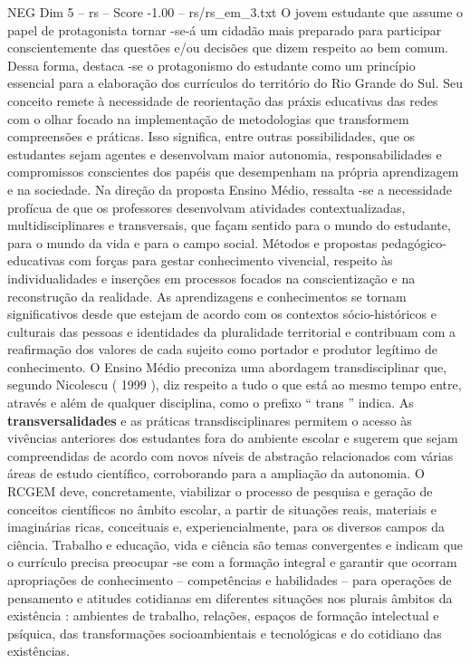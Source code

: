 \begin{textsample}{NEG Dim 5 – rs – Score -1.00 – rs/rs\_em\_3.txt}
O jovem estudante que assume o papel de protagonista tornar -se-á um cidadão mais preparado para participar conscientemente das questões e/ou decisões que dizem respeito ao bem comum.
Dessa forma, destaca -se o protagonismo do estudante como um princípio essencial para a elaboração dos currículos do território do Rio Grande do Sul.
Seu conceito remete à necessidade de reorientação das práxis educativas das redes com o olhar focado na implementação de metodologias que transformem compreensões e práticas.
Isso significa, entre outras possibilidades, que os estudantes sejam agentes e desenvolvam maior autonomia, responsabilidades e compromissos conscientes dos papéis que desempenham na própria aprendizagem e na sociedade.
Na direção da proposta Ensino Médio, ressalta -se a necessidade profícua de que os professores desenvolvam atividades contextualizadas, multidisciplinares e transversais, que façam sentido para o mundo do estudante, para o mundo da vida e para o campo social.
Métodos e propostas pedagógico-educativas com forças para gestar conhecimento vivencial, respeito às individualidades e inserções em processos focados na conscientização e na reconstrução da realidade.
As aprendizagens e conhecimentos se tornam significativos desde que estejam de acordo com os contextos sócio-históricos e culturais das pessoas e identidades da pluralidade territorial e contribuam com a reafirmação dos valores de cada sujeito como portador e produtor legítimo de conhecimento.
O Ensino Médio preconiza uma abordagem transdisciplinar que, segundo Nicolescu ( 1999 ), diz respeito a tudo o que está ao mesmo tempo entre, através e além de qualquer disciplina, como o prefixo “ trans ” indica.
As \textbf{transversalidades} e as práticas transdisciplinares permitem o acesso às vivências anteriores dos estudantes fora do ambiente escolar e sugerem que sejam compreendidas de acordo com novos níveis de abstração relacionados com várias áreas de estudo científico, corroborando para a ampliação da autonomia.
O RCGEM deve, concretamente, viabilizar o processo de pesquisa e geração de conceitos científicos no âmbito escolar, a partir de situações reais, materiais e imaginárias ricas, conceituais e, experiencialmente, para os diversos campos da ciência.
Trabalho e educação, vida e ciência são temas convergentes e indicam que o currículo precisa preocupar -se com a formação integral e garantir que ocorram apropriações de conhecimento – competências e habilidades – para operações de pensamento e atitudes cotidianas em diferentes situações nos plurais âmbitos da existência : ambientes de trabalho, relações, espaços de formação intelectual e psíquica, das transformações socioambientais e tecnológicas e do cotidiano das existências.

\end{textsample}
